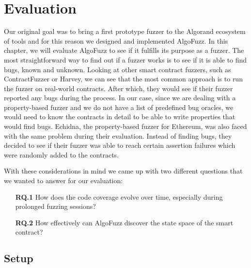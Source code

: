 
\chapter{Evaluation}\label{chapter:evaluation}
Our original goal was to bring a first prototype fuzzer to the Algorand ecosystem of tools and for this reason we designed and implemented AlgoFuzz.
In this chapter, we will evaluate AlgoFuzz to see if it fulfills its purpose as a fuzzer.
The most straightforward way to find out if a fuzzer works is to see if it is able to find bugs, known and unknown.
Looking at other smart contract fuzzers, such as ContractFuzzer or Harvey, we can see that the most common approach is to run the fuzzer on real-world contracts.
After which, they would see if their fuzzer reported any bugs during the process.
In our case, since we are dealing with a property-based fuzzer and we do not have a list of predefined bug oracles, we would need to know the contracts in detail to be able to write properties that would find bugs.
Echidna, the property-based fuzzer for Ethereum, was also faced with the same problem during their evaluation.
Instead of finding bugs, they decided to see if their fuzzer was able to reach certain assertion failures which were randomly added to the contracts.

With these considerations in mind we came up with two different questions that we wanted to answer for our evaluation:
\begin{enumerate}
    \item[\textbf{RQ.1}] How does the code coverage evolve over time, especially during prolonged fuzzing sessions?

    \item[\textbf{RQ.2}] How effectively can AlgoFuzz discover the state space of the smart contract?
\end{enumerate}

\section{Setup}

